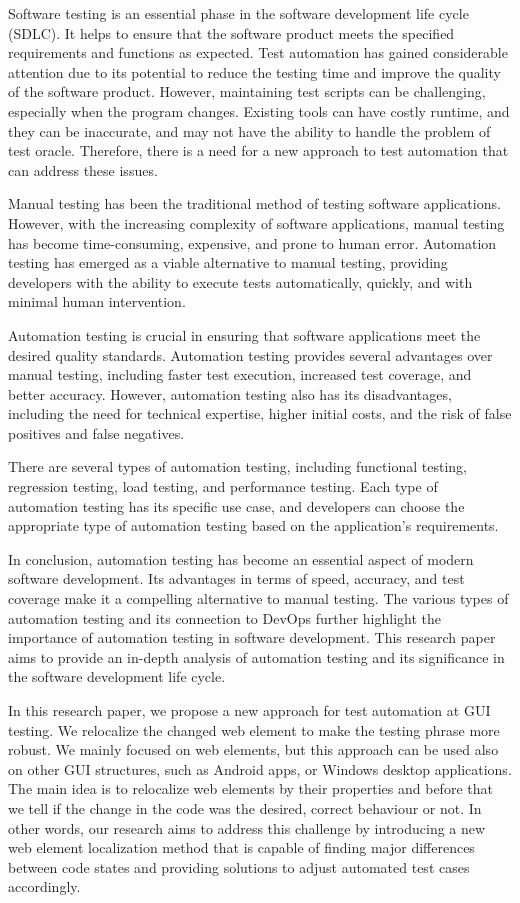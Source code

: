 \documentclass{article}
\begin{document}
Software testing is an essential phase in the software development life cycle (SDLC). It helps to ensure that the software product meets the specified requirements and functions as expected. Test automation has gained considerable attention due to its potential to reduce the testing time and improve the quality of the software product. However, maintaining test scripts can be challenging, especially when the program changes\cite{gui_testing, gui_test_costs}. Existing tools can have costly runtime, and they can be inaccurate, and may not have the ability to handle the problem of test oracle\cite{test_oracle_ai}. Therefore, there is a need for a new approach to test automation that can address these issues.

Manual testing has been the traditional method of testing software applications. However, with the increasing complexity of software applications, manual testing has become time-consuming, expensive, and prone to human error\cite{gui_test_costs}. Automation testing has emerged as a viable alternative to manual testing, providing developers with the ability to execute tests automatically, quickly, and with minimal human intervention.

Automation testing is crucial in ensuring that software applications meet the desired quality standards. Automation testing provides several advantages over manual testing, including faster test execution, increased test coverage, and better accuracy. However, automation testing also has its disadvantages, including the need for technical expertise, higher initial costs, and the risk of false positives and false negatives.

There are several types of automation testing, including functional testing, regression testing, load testing, and performance testing. Each type of automation testing has its specific use case, and developers can choose the appropriate type of automation testing based on the application's requirements.

In conclusion, automation testing has become an essential aspect of modern software development. Its advantages in terms of speed, accuracy, and test coverage make it a compelling alternative to manual testing. The various types of automation testing and its connection to DevOps further highlight the importance of automation testing in software development. This research paper aims to provide an in-depth analysis of automation testing and its significance in the software development life cycle.

In this research paper, we propose a new approach for test automation at GUI testing. We relocalize the changed web element to make the testing phrase more robust. We mainly focused on web elements, but this approach can be used also on other GUI structures, such as Android apps, or Windows desktop applications. The main idea is to relocalize web elements by their properties and  before that we tell if the change in the code was the desired, correct behaviour or not. 
In other words, our research aims to address this challenge by introducing a new web element localization method that is capable of finding major differences between code states and providing solutions to adjust automated test cases accordingly.
\end{document}
